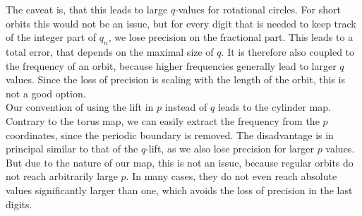 The caveat is, that this leads to large $q$-values for rotational circles.
For short orbits this would not be an issue, but for every digit that is needed to keep track of the integer part of $q_n$, we lose precision on the fractional part. 
This leads to a total error, that depends on the maximal size of $q$.
It is therefore also coupled to the frequency of an orbit, because higher frequencies generally lead to larger $q$ values. 
Since the loss of precision is scaling with the length of the orbit, this is not a good option.
\\
Our convention of using the lift in $p$ instead of $q$ leads to the cylinder map.
Contrary to the torus map, we can easily extract the frequency from the $p$ coordinates, since the periodic boundary is removed. 
The disadvantage is in principal similar to that of the $q$-lift, as we also lose precision for larger $p$ values. 
But due to the nature of our map, this is not an issue, because regular orbits do not reach arbitrarily large $p$.
In many cases, they do not even reach absolute values significantly larger than one, which avoids the loss of precision in the last digits. 
